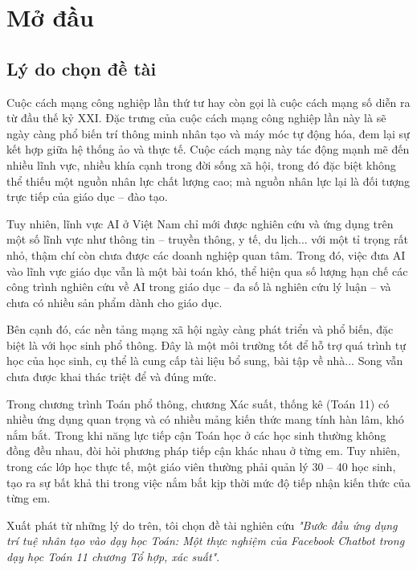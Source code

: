 \chapter*{Mở đầu}

\renewcommand*{\thesection}{\arabic{section}}
\renewcommand*{\thesubsection}{\alph{subsection}}

\section{Lý do chọn đề tài}
Cuộc cách mạng công nghiệp lần thứ tư hay còn gọi là cuộc cách mạng số diễn ra từ đầu thế kỷ XXI. Đặc trưng của cuộc cách mạng công nghiệp lần này là sẽ ngày càng phổ biến trí thông minh nhân tạo và máy móc tự động hóa, đem lại sự kết hợp giữa hệ thống ảo và thực tế. Cuộc cách mạng này tác động mạnh mẽ đến nhiều lĩnh vực, nhiều khía cạnh trong đời sống xã hội, trong đó đặc biệt không thể thiếu một nguồn nhân lực chất lượng cao; mà nguồn nhân lực lại là đối tượng trực tiếp của giáo dục – đào tạo.\par
Tuy nhiên, lĩnh vực AI ở Việt Nam chỉ mới được nghiên cứu và ứng dụng trên một số lĩnh vực như thông tin – truyền thông, y tế, du lịch... với một tỉ trọng rất nhỏ, thậm chí còn chưa được các doanh nghiệp quan tâm. Trong đó, việc đưa AI vào lĩnh vực giáo dục vẫn là một bài toán khó, thể hiện qua số lượng hạn chế các công trình nghiên cứu về AI trong giáo dục – đa số là nghiên cứu lý luận – và chưa có nhiều sản phẩm dành cho giáo dục.\par
Bên cạnh đó, các nền tảng mạng xã hội ngày càng phát triển và phổ biến, đặc biệt là với học sinh phổ thông. Đây là một môi trường tốt để hỗ trợ quá trình tự học của học sinh, cụ thể là cung cấp tài liệu bổ sung, bài tập về nhà... Song vẫn chưa được khai thác triệt để và đúng mức.\par
Trong chương trình Toán phổ thông, chương Xác suất, thống kê (Toán 11) có nhiều ứng dụng quan trọng và có nhiều mảng kiến thức mang tính hàn lâm, khó nắm bắt. Trong khi năng lực tiếp cận Toán học ở các học sinh thường không đồng đều nhau, đòi hỏi phương pháp tiếp cận khác nhau ở từng em. Tuy nhiên, trong các lớp học thực tế, một giáo viên thường phải quản lý 30 – 40 học sinh, tạo ra sự bất khả thi trong việc nắm bắt kịp thời mức độ tiếp nhận kiến thức của từng em.\par
Xuất phát từ những lý do trên, tôi chọn đề tài nghiên cứu \textit{"Bước đầu ứng dụng trí tuệ nhân tạo vào dạy học Toán: Một thực nghiệm của Facebook Chatbot trong dạy học Toán 11 chương Tổ hợp, xác suất"}.\par

